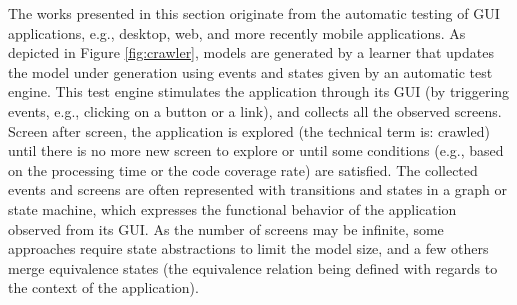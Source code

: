 The works presented in this section originate from the automatic
testing of GUI applications, e.g., desktop, web, and more recently
mobile applications. As depicted in Figure \ref{fig:crawler},
models are generated by a learner that updates the model under
generation using events and states given by an automatic test
engine. This test engine stimulates the application through its
GUI (by triggering events, e.g., clicking on a button or a link),
and collects all the observed screens.  Screen after screen, the
application is explored (the technical term is: crawled) until
there is no more new screen to explore or until some conditions
(e.g., based on the processing time or the code coverage rate)
are satisfied. The collected events and screens are often
represented with transitions and states in a graph or state
machine, which expresses the functional behavior of the
application observed from its GUI. As the number of screens may
be infinite, some approaches require state abstractions to limit
the model size, and a few others merge equivalence states (the
equivalence relation being defined with regards to the context of
the application).

